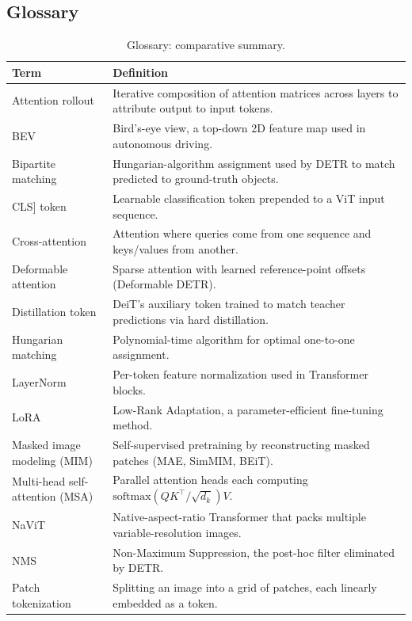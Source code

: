 \documentclass{article}
\begin{document}
\subsection{Glossary}\label{glossary}

\begin{table}[t]
\centering
\caption{Glossary: comparative summary.}
\label{tab:glossary}
\begin{tabular}{>{\raggedright\arraybackslash}p{0.2598\linewidth}
  >{\raggedright\arraybackslash}p{0.7402\linewidth}}
\toprule
Term & Definition \\
\midrule
Attention rollout & Iterative composition of attention matrices across layers to attribute output to input tokens. \\
BEV & Bird's-eye view, a top-down 2D feature map used in autonomous driving. \\
Bipartite matching & Hungarian-algorithm assignment used by DETR to match predicted to ground-truth objects. \\
{[}CLS{]} token & Learnable classification token prepended to a ViT input sequence. \\
Cross-attention & Attention where queries come from one sequence and keys/values from another. \\
Deformable attention & Sparse attention with learned reference-point offsets (Deformable DETR). \\
Distillation token & DeiT's auxiliary token trained to match teacher predictions via hard distillation. \\
Hungarian matching & Polynomial-time algorithm for optimal one-to-one assignment. \\
LayerNorm & Per-token feature normalization used in Transformer blocks. \\
LoRA & Low-Rank Adaptation, a parameter-efficient fine-tuning method. \\
Masked image modeling (MIM) & Self-supervised pretraining by reconstructing masked patches (MAE, SimMIM, BEiT). \\
Multi-head self-attention (MSA) & Parallel attention heads each computing \(\mathrm{softmax}(QK^\top / \sqrt{d_k}) V\). \\
NaViT & Native-aspect-ratio Transformer that packs multiple variable-resolution images. \\
NMS & Non-Maximum Suppression, the post-hoc filter eliminated by DETR. \\
Patch tokenization & Splitting an image into a grid of patches, each linearly embedded as a token. \\

\end{tabular}
\end{table}
\end{document}
